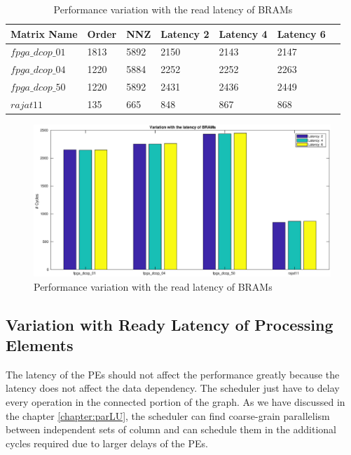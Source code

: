 \begin{table}[H]
    \centering
    \caption{Performance variation with the read latency of BRAMs}
    \label{tab:res:bramLatVar:data}
    \begin{tabular}{l l l l l l l} 
        \toprule
        Matrix Name & Order  & NNZ & Latency 2 & Latency 4 & Latency 6  \\
        \midrule
        $fpga\_dcop\_01$ & 1813 & 5892 &         2150  &      2143   &     2147    \\
        $fpga\_dcop\_04$ & 1220 & 5884 &         2252  &      2252   &     2263    \\
        $fpga\_dcop\_50$ & 1220 & 5892 &         2431  &      2436   &     2449    \\
        $rajat11$      & 135  &  665   &          848  &       867   &      868     \\
        \bottomrule
    \end{tabular}
\end{table}

\begin{figure}[H]
    \centering
    \includegraphics[width = \textwidth]{./Results/bramLatVar.eps}
    \caption{Performance variation with the read latency of BRAMs}
    \label{fig:res:bramLatVar:plot}
\end{figure}



\subsection{Variation with Ready Latency of Processing Elements}
The latency of the PEs should not affect the performance greatly because the 
latency does not affect the data dependency. The scheduler just have to delay every operation 
in the connected portion of the graph. As we have discussed in the chapter \ref{chapter:parLU}, 
the scheduler can find coarse-grain parallelism between independent sets of column and can
schedule them in the additional cycles required due to larger delays of the PEs.

